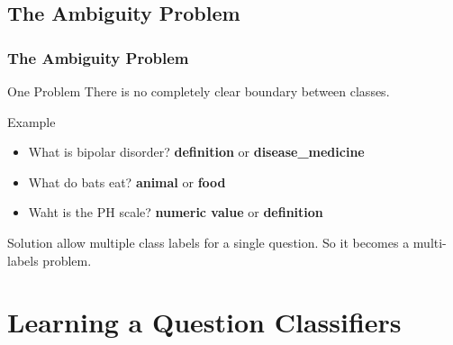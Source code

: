 \documentclass{beamer}
\begin{document}
    \subsection{The Ambiguity Problem}
    \begin{frame}
    \frametitle{The Ambiguity Problem}
        \begin{block}{One Problem}
        There is no completely clear 
        boundary between classes.    
        \end{block}

        \begin{block}{Example}
            \begin{itemize}
                \item What is bipolar disorder?  
                \textbf{definition} or \textbf{disease\_medicine} 
                \item What do bats eat? 
                \textbf{animal} or \textbf{food}
                \item Waht is the PH scale? 
                \textbf{numeric value} or \textbf{definition}
            \end{itemize}                
        \end{block}

        \begin{block}{Solution}
            allow multiple class labels for a 
            single question. So it becomes a multi-labels
            problem.
        \end{block}
    \end{frame}

    
    \section{Learning a Question Classifiers}
\end{document}
